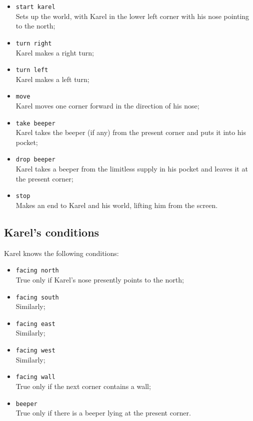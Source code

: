 \begin{itemize}
\item {\tt start karel}\\
	Sets up the world, with Karel in the lower left corner 
	with his nose pointing to the north;
\item {\tt turn right}\\
	Karel makes a right turn;
\item {\tt turn left}\\
	Karel makes a left turn;
\item {\tt move}\\
	Karel moves one corner forward in the direction of his nose;
\item {\tt take beeper}\\
	Karel takes the beeper (if any) from the present
	corner and puts it into his pocket;
\item {\tt drop beeper}\\
	Karel takes a beeper from the limitless supply
	in his pocket and leaves it at the present corner;
\item {\tt stop}\\
	Makes an end to Karel and his world, lifting him from
	the screen.
\end{itemize}

\subsection{Karel's conditions}

Karel knows the following conditions:

\begin{itemize}
\item {\tt facing north}\\
	True only if Karel's nose presently points to the north;
\item {\tt facing south}\\
	Similarly;
\item {\tt facing east}\\
	Similarly;
\item {\tt facing west}\\
	Similarly;
\item {\tt facing wall}\\
	True only if the next corner contains a wall;
\item {\tt beeper}\\
	True only if there is a beeper lying at the present corner.
\end{itemize}

